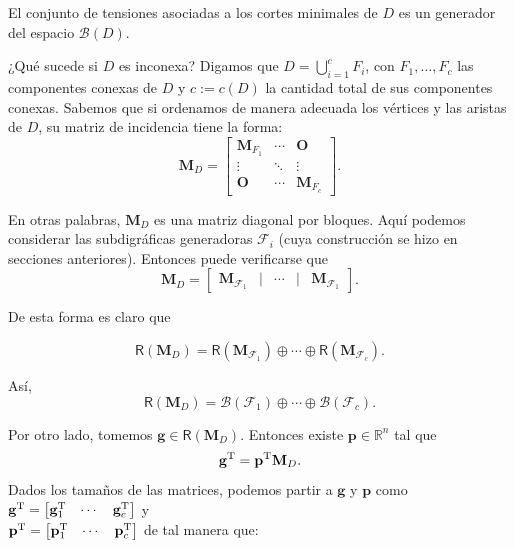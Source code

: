 \vspace{1cm}
\begin{cor}
El conjunto de tensiones asociadas a los cortes minimales de $D$ es un generador del espacio $\mathcal{B}(D)$.
\end{cor}

¿Qué sucede si $D$ es inconexa? Digamos que $D = \bigcup_{i=1}^{c}F_{i}$, con $F_{1}, \ldots, F_{c}$ las componentes conexas de $D$ y $c:=c(D)$ la cantidad total de sus componentes conexas. Sabemos que si ordenamos de manera adecuada los vértices y las aristas de $D$, su matriz de incidencia tiene la forma:
$$
\mathbf{M}_{D} = \begin{bmatrix}
\mathbf{M}_{F_{1}} & \cdots  & \mathbf{O} \\ 
\vdots & \ddots  & \vdots \\ 
\mathbf{O} & \cdots & \mathbf{M}_{F_{c}}
\end{bmatrix}.
$$

En otras palabras, $\mathbf{M}_{D}$ es una matriz diagonal por bloques. Aquí podemos considerar las subdigráficas generadoras $\mathcal{F}_{i}$ (cuya construcción se hizo en secciones anteriores). Entonces puede verificarse que 
$$
\mathbf{M}_{D} = \begin{bmatrix}
\mathbf{M}_{\mathcal{F}_{1}} &|& \cdots &|& \mathbf{M}_{\mathcal{F}_{1}}
\end{bmatrix}.
$$

De esta forma es claro que 

$$\mathsf{R}(\mathbf{M}_{D}) = \mathsf{R}(\mathbf{M}_{\mathcal{F}_{1}}) \oplus \cdots \oplus \mathsf{R}(\mathbf{M}_{\mathcal{F}_{c}}).$$

 Así, $$\mathsf{R}(\mathbf{M}_{D}) = \mathcal{B}(\mathcal{F}_{1}) \oplus \cdots \oplus \mathcal{B}(\mathcal{F}_{c}).$$

Por otro lado, tomemos $\mathbf{g} \in \mathsf{R}(\mathbf{M}_{D})$. Entonces existe $\mathbf{p} \in \mathbb{R}^{n}$ tal que $$\mathbf{g}^{\textnormal{T}} = \mathbf{p}^{\textnormal{T}}\mathbf{M}_{D}.$$ Dados los tamaños de las matrices, podemos partir a $\mathbf{g}$ y $\mathbf{p}$ como $\mathbf{g}^{\textnormal{T}} = \begin{bmatrix}
\mathbf{g}_{1}^{\textnormal{T}} & \cdots  & \mathbf{g}_{c}^{\textnormal{T}} 
\end{bmatrix}$ y\\ $\mathbf{p}^{\textnormal{T}} = \begin{bmatrix}
\mathbf{p}_{1}^{\textnormal{T}} & \cdots  & \mathbf{p}_{c}^{\textnormal{T}} 
\end{bmatrix}$ de tal manera que:

